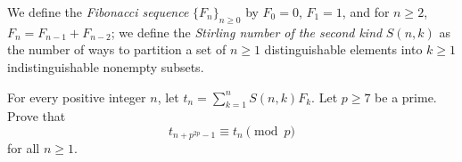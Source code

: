 We define the \textit{Fibonacci sequence} $\{F_n\}_{n\ge0}$ by $F_0=0$, $F_1=1$, and for $n\ge2$, $F_n=F_{n-1}+F_{n-2}$; we define the \textit{Stirling number of the second kind} $S(n,k)$ as the number of ways to partition a set of $n\ge1$ distinguishable elements into $k\ge1$ indistinguishable nonempty subsets.

For every positive integer $n$, let $t_n = \sum_{k=1}^{n} S(n,k) F_k$. Let $p\ge7$ be a prime. Prove that \[ t_{n+p^{2p}-1} \equiv t_n \pmod{p} \] for all $n\ge1$.


